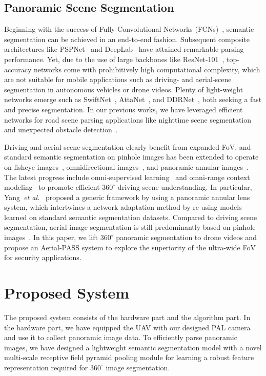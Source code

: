 \documentclass[letterpaper, 10 pt, conference]{ieeeconf}
\begin{document}
\subsection{Panoramic Scene Segmentation}

Beginning with the success of Fully Convolutional Networks (FCNs)~\cite{fcn}, semantic segmentation can be achieved in an end-to-end fashion. Subsequent composite architectures like PSPNet~\cite{pspnet} and DeepLab~\cite{deeplab} have attained remarkable parsing performance.
Yet, due to the use of large backbones like ResNet-101~\cite{resnet}, top-accuracy networks come with prohibitively high computational complexity, which are not suitable for mobile applications such as driving- and aerial-scene segmentation in autonomous vehicles or drone videos. 
Plenty of light-weight networks emerge such as SwiftNet~\cite{swiftnet}, AttaNet~\cite{attanet}, and DDRNet~\cite{ddrnet}, both seeking a fast and precise segmentation.
In our previous works, we have leveraged efficient networks for road scene parsing applications like nighttime scene segmentation~\cite{see_clearer_at_night} and unexpected obstacle detection~\cite{rfnet}.

Driving and aerial scene segmentation clearly benefit from expanded FoV, and standard semantic segmentation on pinhole images has been extended to operate on fisheye images~\cite{universal}, omnidirectional images~\cite{omniscape}, and panoramic annular images~\cite{pass}.
The latest progress include omni-supervised learning~\cite{ooss} and omni-range context modeling~\cite{omnirange} to promote efficient $360^\circ$ driving scene understanding.
In particular, Yang~\textit{et al.}~\cite{pass} proposed a generic framework by using a panoramic annular lens system, which intertwines a network adaptation method by re-using models learned on standard semantic segmentation datasets.
Compared to driving scene segmentation, aerial image segmentation is still predominantly based on pinhole images~\cite{agriculture_vision,relation_augmented,aerial_lanenet,pointflow}.
In this paper, we lift $360^\circ$ panoramic segmentation to drone videos and propose an Aerial-PASS system to explore the superiority of the ultra-wide FoV for security applications.



\section{Proposed System}

The proposed system consists of the hardware part and the algorithm part.
In the hardware part, we have equipped the UAV with our designed PAL camera and use it to collect panoramic image data.
To efficiently parse panoramic images, we have designed a lightweight semantic segmentation model with a novel multi-scale receptive field pyramid pooling module for learning a robust feature representation required for $360^\circ$ image segmentation.
\end{document}
